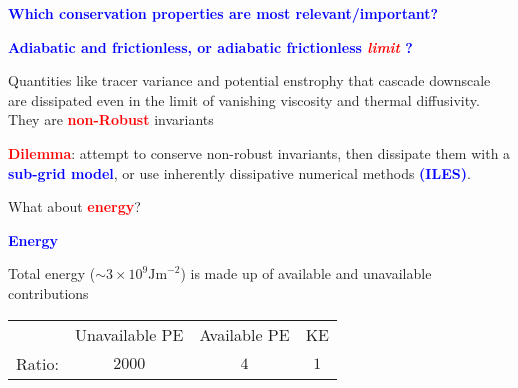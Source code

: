 \documentclass[a4]{seminar}
\newcommand{\R}[1]{\textcolor{red}{#1}}
\newcommand{\B}[1]{\textcolor{blue}{#1}}
\begin{document}
\begin{slide}

\B{\bf Which conservation properties are most relevant/important?}

\vspace{2mm}

\B{\bf Adiabatic and frictionless, or adiabatic frictionless \R{\it limit} ?}

\vspace{3mm}

Quantities like tracer variance and potential enstrophy that cascade
downscale are dissipated even in the limit of vanishing viscosity and
thermal diffusivity. They are \R{\bf non-Robust} invariants

\vspace{2mm}

\R{\bf Dilemma}: attempt to conserve non-robust invariants, then dissipate
them with a \B{\bf sub-grid model}, or use inherently dissipative
numerical methods \B{\bf (ILES)}.

\vspace{2mm}

What about \R{\bf energy}?


\end{slide}

\begin{slide}

\B{\bf Energy}

\vspace{2mm}

Total energy (\( \sim 3 \times 10^9 \mathrm{Jm}^{-2} \)) is made up of
available and unavailable contributions

\begin{center}

\vspace{2mm}

\begin{tabular}{|c|ccc|}
\hline

&
Unavailable PE
&
Available PE
&
KE
\\
Ratio:
&
\( 2000 \)
&
\( 4 \)
&
\( 1 \)
\\
\hline
\end{tabular}

\end{center}

\end{slide}
\end{document}
